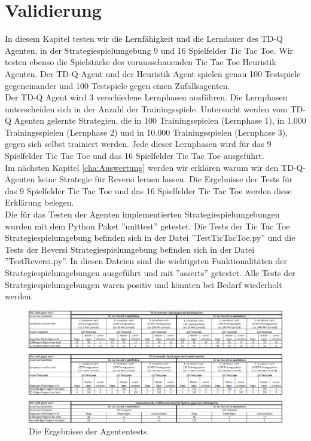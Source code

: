 \chapter{Validierung}
\label{cha:Validierung}

In diesem Kapitel testen wir die Lernfähigkeit und die Lerndauer des TD-Q Agenten, in der Strategiespielumgebung 9 und 16 Spielfelder Tic Tac Toe. Wir testen ebenso die Spielstärke des vorausschauenden Tic Tac Toe Heuristik Agenten. Der TD-Q-Agent und der Heuristik Agent spielen genau 100 Testspiele gegeneinander und 100 Testspiele gegen einen Zufallsagenten. \\

Der TD-Q Agent wird 3 verschiedene Lernphasen ausführen. Die Lernphasen unterscheiden sich in der Anzahl der Trainingsspiele. Untersucht werden vom TD-Q Agenten gelernte Strategien, die in 100 Trainingsspielen (Lernphase 1), in 1.000 Trainingsspielen (Lernphase 2) und in 10.000 Trainingsspielen (Lernphase 3), gegen sich selbst trainiert werden. Jede dieser Lernphasen wird für das 9 Spielfelder Tic Tac Toe und das 16 Spielfelder Tic Tac Toe ausgeführt. \\

Im nächsten Kapitel \ref{cha:Auswertung} werden wir erklären warum wir den TD-Q-Agenten keine Strategie für Reversi lernen lassen. Die Ergebnisse der Tests für das 9 Spielfelder Tic Tac Toe und das 16 Spielfelder Tic Tac Toe werden diese Erklärung belegen. \\

Die für das Testen der Agenten implementierten Strategiespielumgebungen wurden mit dem Python Paket ''unittest'' getestet. Die Tests der Tic Tac Toe Strategiespielumgebung befinden sich in der Datei ''TestTicTacToe.py'' und die Tests der Reversi Strategiespielumgebung befinden sich in der Datei ''TestReversi.py''. In diesen Dateien sind die wichtigsten Funktionalitäten der Strategiespielumgebungen ausgeführt und mit ''asserts'' getestet. Alle Tests der Strategiespielumgebungen waren positiv und könnten bei Bedarf wiederholt werden. \\

\begin{figure}[!htbp]
  \centering
  \includegraphics[angle = 90, scale = 0.8]{inhalt/abbildungen/testergebnisse.png}
  \caption{Die Ergebnisse der Agententests.}
  \label{fig:Ergebnisse der Agententests}
\end{figure} 